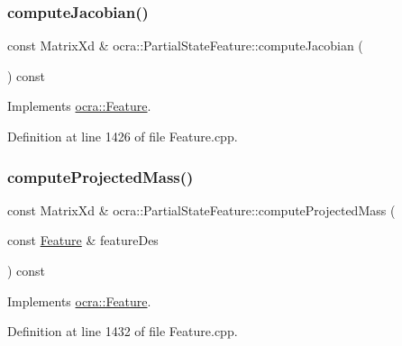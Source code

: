 \subsubsection{\texorpdfstring{compute\+Jacobian()}{computeJacobian()}\hspace{0.1cm}{\footnotesize\ttfamily [2/2]}}
{\footnotesize\ttfamily const Matrix\+Xd \& ocra\+::\+Partial\+State\+Feature\+::compute\+Jacobian (\begin{DoxyParamCaption}{ }\end{DoxyParamCaption}) const\hspace{0.3cm}{\ttfamily [virtual]}}



Implements \hyperlink{classocra_1_1Feature_adbab3b388657555abb805bb971c2491f}{ocra\+::\+Feature}.



Definition at line 1426 of file Feature.\+cpp.

\hypertarget{classocra_1_1PartialStateFeature_a9554341f9015361e4c7dc544f6415470}{}\label{classocra_1_1PartialStateFeature_a9554341f9015361e4c7dc544f6415470} 
\subsubsection{\texorpdfstring{compute\+Projected\+Mass()}{computeProjectedMass()}\hspace{0.1cm}{\footnotesize\ttfamily [1/2]}}
{\footnotesize\ttfamily const Matrix\+Xd \& ocra\+::\+Partial\+State\+Feature\+::compute\+Projected\+Mass (\begin{DoxyParamCaption}\item[{const \hyperlink{classocra_1_1Feature}{Feature} \&}]{feature\+Des }\end{DoxyParamCaption}) const\hspace{0.3cm}{\ttfamily [virtual]}}



Implements \hyperlink{classocra_1_1Feature_a44e11dd349e92971fefebff354e7214b}{ocra\+::\+Feature}.



Definition at line 1432 of file Feature.\+cpp.

\hypertarget{classocra_1_1PartialStateFeature_a984c0fd5400ff69faaab55d81cf8320b}{}\label{classocra_1_1PartialStateFeature_a984c0fd5400ff69faaab55d81cf8320b} 
